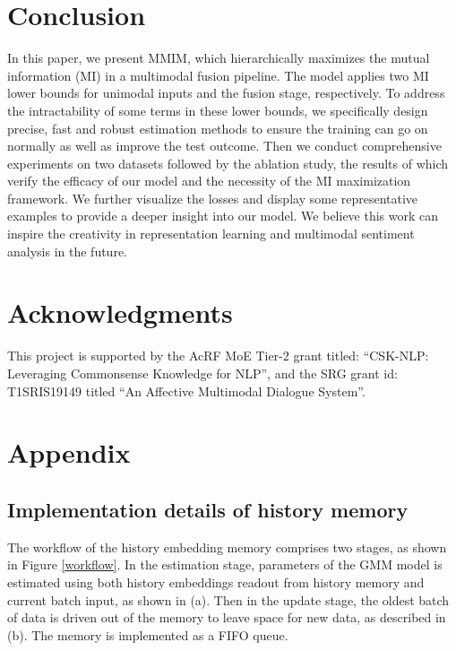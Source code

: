 \documentclass[11pt]{article}
\newcommand{\modelname}{MMIM}
\begin{document}
%
 
\section{Conclusion}
In this paper, we present \modelname, which hierarchically maximizes the mutual information (MI) in a multimodal fusion pipeline.
The model applies two MI lower bounds for unimodal inputs and the fusion stage, respectively.
To address the intractability of some terms in these lower bounds, we specifically design precise, fast and robust estimation methods to ensure the training can go on normally as well as improve the test outcome.
Then we conduct comprehensive experiments on two datasets followed by the ablation study, the results of which verify the efficacy of our model and the necessity of the MI maximization framework.
We further visualize the losses and display some representative examples to provide a deeper insight into our model.
We believe this work can inspire the creativity in representation learning and multimodal sentiment analysis in the future.

\section*{Acknowledgments}
This project is supported by the AcRF MoE Tier-2 grant titled: ``CSK-NLP: Leveraging Commonsense Knowledge for NLP'', and the SRG grant id: T1SRIS19149 titled ``An Affective Multimodal Dialogue System''.
 






\newpage
\appendix

\section{Appendix}
\label{sec:appendix}
\subsection{Implementation details of history memory}
The workflow of the history embedding memory comprises two stages, as shown in Figure \ref{workflow}. In the estimation stage, parameters of the GMM model is estimated using both history embeddings readout from history memory and current batch input, as shown in (a).
Then in the update stage, the oldest batch of data is driven out of the memory to leave space for new data, as described in (b). 
The memory is implemented as a FIFO queue.
\end{document}
